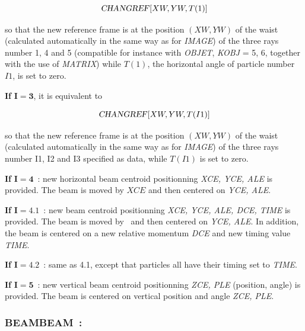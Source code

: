 {$$ \text{\textsl{CHANGREF}} \lbrack XW, YW, T(1)\rbrack $$

\noindent  so that the new reference frame is at the position $ (XW, YW) $ of
the waist (calculated automatically in the same way as for 
\textsl{IMAGE}) of the three rays number 1, 4 and 5 (compatible for instance
with \textsl{OBJET}, \textsl{KOBJ}  =  5, 6,  together with the 
use of \textsl{MATRIX}) while $T(1)$, the horizontal angle of particle number $I1$,  is set to zero.  

\bigskip

\noindent\textbf{If} $\mathbf{I=3}$,  it is equivalent to 

$$\text{\textsl{CHANGREF}} \lbrack XW,YW,T(I1)\rbrack $$

\noindent  so that the new reference frame is at the position $ (XW, YW) $ of
the waist (calculated automatically in the same way as for 
\textsl{IMAGE}) of the three rays number I1, I2 and I3 specified as data,  while $T(I1)$ is set to zero.
 

\bigskip

\noindent\textbf{If} $\mathbf{I=4}$~: new horizontal beam centroid positionning \textsl{XCE, YCE, ALE} is provided.  
 The beam is moved by $XCE$ and then centered on \textsl{YCE, ALE}. 
 
\bigskip

\noindent\textbf{If} $\mathbf{I=4.1}$~: new  beam centroid positionning \textsl{XCE, YCE, ALE, DCE, TIME} is provided. 
 The beam is moved by \XCE\ and then centered on \textsl{YCE, ALE}. 
In addition, the beam is centered on a new relative momentum \textsl{DCE} and new timing value \textsl{TIME}.

\bigskip

\noindent\textbf{If} $\mathbf{I=4.2}$~: same as 4.1, except that particles all have their timing set to \textsl{TIME}. 


\bigskip

\noindent\textbf{If} $\mathbf{I=5}$~: new vertical beam centroid positionning \textsl{ZCE, PLE} (position, angle) is provided.  
 The beam is centered on vertical position and angle \textsl{ZCE, PLE}. 
 
 


\newpage


\subsubsection*{BEAMBEAM~: \BEAMBEAMTitl}\label{BEAMBEAM}  
  
\medskip

}

